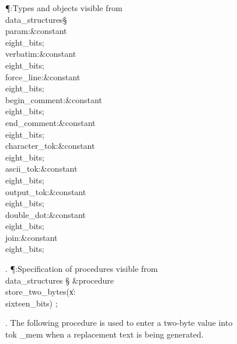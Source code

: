 \Y\P\?\4:Types and objects visible from \\{data\_structures}\X\mathrel{+}\S%
\?\6
\\{param}\?:\?\&{constant}\8\\{eight\_bits}\?\K{};\6
\\{verbatim}\?:\?\&{constant}\8\\{eight\_bits}\?\K{};\6
\\{force\_line}\?:\?\&{constant}\8\\{eight\_bits}\?\K{};\6
\\{begin\_comment}\?:\?\&{constant}\8\\{eight\_bits}\?\K{}\?;\6
\\{end\_comment}\?:\?\&{constant}\8\\{eight\_bits}\?\K{}\?;\6
\\{character\_tok}\?:\?\&{constant}\8\\{eight\_bits}\?\K{}\?;\6
\\{ascii\_tok}\?:\?\&{constant}\8\\{eight\_bits}\?\K{}\?;\6
\\{output\_tok}\?:\?\&{constant}\8\\{eight\_bits}\?\K{}\?;\6
\\{double\_dot}\?:\?\&{constant}\8\\{eight\_bits}\?\K{}\?;\6
\\{join}\?:\?\&{constant}\8\\{eight\_bits}\?\K{}\?;\par
\fi

. \P\?:Specification of procedures visible from \\{data\_structures}\X%
\mathrel{+}\S\?\6
\&{procedure}\8\1\\{store\_two\_bytes}\?(\1\?\|x\?:\?\\{sixteen\_bits}\?\2)\?%
\2;\par
\fi

. The following procedure is used to enter a two-byte value into \\{tok%
\_mem}
when a replacement text is being generated.

